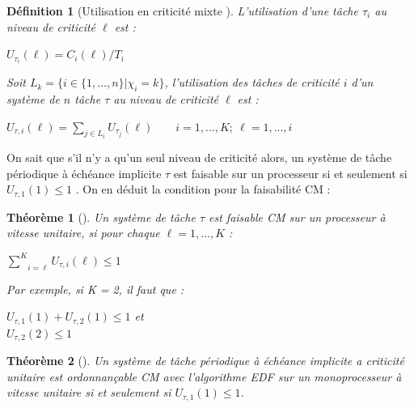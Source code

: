 \documentclass[a4paper]{report}
\theoremstyle{break}
\newtheorem{defin}{Définition}
\newtheorem{theo}{Théorème}
\begin{document}
\begin{defin}[Utilisation en criticité mixte \cite{BaruahBDMSS11}]
L'utilisation d'une tâche $\tau_i$ au niveau de criticité $\ell$ est :
\begin{center}
$U_{\tau_i}(\ell) = C_i(\ell)/T_i$
\end{center}
Soit $L_k = \{i \in \{1, ..., n\} | \chi_i = k\}$, l'utilisation des tâches de criticité $i$ d'un système de $n$ tâche $\tau$ au niveau de criticité $\ell$ est :
\begin{center}
$U_{\tau, i}(\ell) = \underset{j \in L_i}{\sum} U_{\tau_j}(\ell) \qquad i = 1,...,K;\ \ell = 1,...,i$
\end{center}
\end{defin}

On sait que s'il n'y a qu'un seul niveau de criticité alors, un système de tâche périodique à échéance implicite $\tau$ est faisable sur un processeur si et seulement si $U_{\tau, 1}(1) \leq 1$ \cite{liu1973scheduling}. On en déduit la condition pour la faisabilité CM :
\begin{theo}[\cite{BaruahBDMSS11}]
Un système de tâche $\tau$ est faisable CM sur un processeur à vitesse unitaire, si pour chaque $\ell = 1, ..., K$ :
\begin{center}
$\underset{i = \ell}{\overset{K}{\sum}} U_{\tau,i}(\ell) \leq 1$
\end{center}
 
 Par exemple, si K = 2, il faut que :
 
\begin{center}
$U_{\tau, 1}(1) + U_{\tau, 2}(1) \leq 1$ et\\
$U_{\tau, 2}(2) \leq 1$
\end{center}
\end{theo}

\begin{theo}[\cite{BaruahBDMSS11}]
Un système de tâche périodique à échéance implicite a criticité unitaire est ordonnançable CM avec l'algorithme EDF sur un monoprocesseur à vitesse unitaire si et seulement si $U_{\tau, 1}(1) \leq 1$.
\end{theo}
\end{document}
